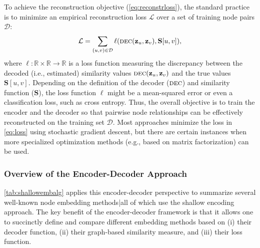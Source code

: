\documentclass[10pt]{book}
\begin{document}
To achieve the reconstruction objective (\autoref{eq:reconstrloss}), the standard practice is to minimize an empirical reconstruction loss $\mathcal L$ over a set of training node pairs $\mathcal D$:
\begin{equation}
    \mathcal L = \sum_{(u,v) \in \mathcal D} \ell (\textsc{dec}(\mathbf z_u, \mathbf z_v), \mathbf S[u, v]),
    \label{eq:loss}
\end{equation}
where $\ell: \mathbb R \times \mathbb R \rightarrow \mathbb R$ is a loss function measuring the discrepancy between the decoded (i.e., estimated) similarity values $\textsc{dec}(\mathbf z_u, \mathbf z_v)$ and the true values $\mathbf S[u, v]$. Depending on the definition of the decoder ($\textsc{dec}$) and similarity function ($\mathbf S$), the loss function $\ell$ might be a mean-squared error or even a classification loss, such as cross entropy. Thus, the overall objective is to train the encoder and the decoder so that pairwise node relationships can be effectively reconstructed on the training set $\mathcal D$. Most approaches minimize the loss in \autoref{eq:loss} using stochastic gradient descent, but there are certain instances when more specialized optimization methods (e.g., based on matrix factorization) can be used.

\subsubsection{Overview of the Encoder-Decoder Approach}

\autoref{tab:shallowembalg} applies this encoder-decoder perspective to summarize several well-known node embedding methods|all of which use the shallow encoding approach. The key benefit of the encoder-decoder framework is that it allows one to succinctly define and compare different embedding methods based on (i) their decoder function, (ii) their graph-based similarity measure, and (iii) their loss function.
\end{document}
